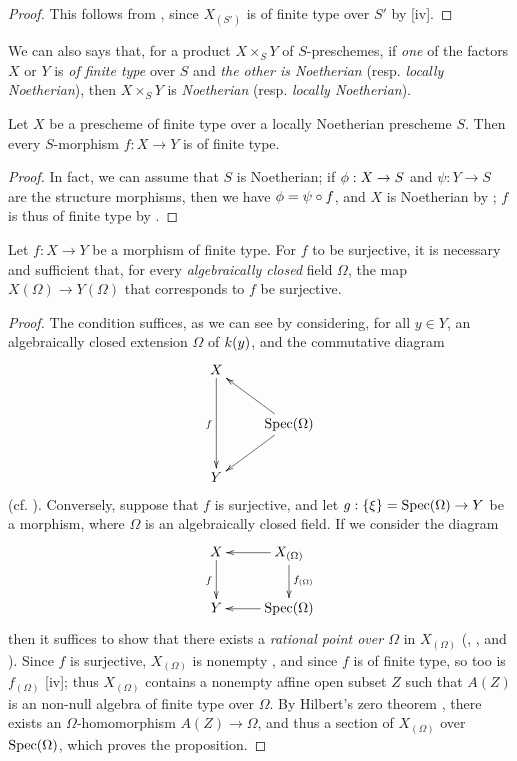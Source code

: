 \begin{proof}
\label{proof-1.6.3.8}
This follows from , since $X_{(S')}$ is of finite type over $S'$ by [iv].
\end{proof}

We can also says that, for a product $X\times_S Y$ of $S$-preschemes, if \emph{one} of the factors
$X$ or $Y$ is \emph{of finite type} over $S$ and \emph{the other is Noetherian} (resp. \emph{locally Noetherian}), then $X\times_S Y$ is \emph{Noetherian} (resp. \emph{locally Noetherian}).

\begin{cor}[6.3.9]
\label{1.6.3.9}
Let $X$ be a prescheme of finite type over a locally Noetherian prescheme $S$.
Then every $S$-morphism $f:X\to Y$ is of finite type.
\end{cor}

\begin{proof}
\label{proof-1.6.3.9}
In fact, we can assume that $S$ is Noetherian;
if $\vphi:X\to S$ and $\psi:Y\to S$ are the structure morphisms, then we have $\phi=\psi\circ f$, and $X$ is Noetherian by ;
$f$ is thus of finite type by .
\end{proof}

\begin{prop}[6.3.10]
\label{1.6.3.10}
Let $f:X\to Y$ be a morphism of finite type.
For $f$ to be surjective, it is necessary and sufficient that, for every \emph{algebraically closed} field $\Omega$, the map $X(\Omega)\to Y(\Omega)$ that corresponds to $f$  be surjective.
\end{prop}

\begin{proof}
\label{proof-1.6.3.10}
The condition suffices, as we can see by considering, for all $y\in Y$, an algebraically closed extension $\Omega$ of $k(y)$, and the commutative diagram
\[
  \xymatrix{
    X\ar[dd]_f\\
    & \Spec(\Omega)\ar[ul]\ar[dl]\\
    Y
  }
\]
(cf. ).
Conversely, suppose that $f$ is surjective, and let $g:\{\xi\}=\Spec(\Omega)\to Y$ be a morphism, where $\Omega$ is an algebraically closed field.
If we consider the diagram
\[
  \xymatrix{
    X\ar[d]_f &
    X_{(\Omega)}\ar[l]\ar[d]^{f_{(\Omega)}}\\
    Y &
    \Spec(\Omega)\ar[l]
  }
\]
then it suffices to show that there exists a \emph{rational point over $\Omega$} in $X_{(\Omega)}$ (, , and ).
Since $f$ is surjective, $X_{(\Omega)}$ is nonempty , and since $f$ is of finite type, so too is $f_{(\Omega)}$ [iv];
thus $X_{(\Omega)}$ contains a nonempty affine open subset $Z$ such that $A(Z)$ is an non-null algebra of finite type over $\Omega$.
By Hilbert's zero theorem \cite{I-21}, there exists an $\Omega$-homomorphism $A(Z)\to\Omega$, and thus a section of $X_{(\Omega)}$ over ${\mathop{\mathrm{Spec}}\nolimits}(\Omega)$, which proves the proposition.
\end{proof}

